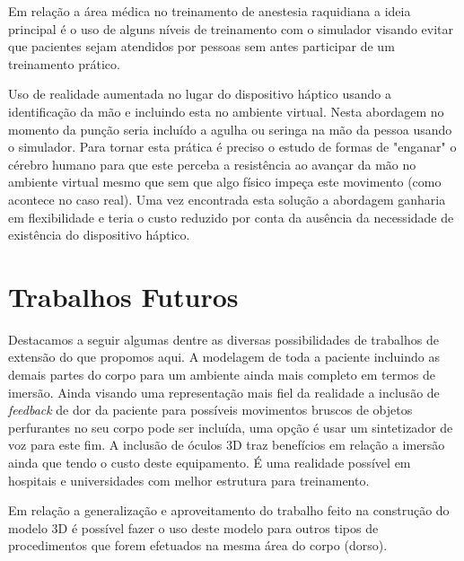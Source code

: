 Em relação a área médica no treinamento de anestesia raquidiana a ideia principal é o uso de alguns níveis de treinamento com o simulador visando evitar que pacientes sejam atendidos por pessoas sem antes participar de um treinamento prático.

Uso de realidade aumentada no lugar do dispositivo háptico usando a identificação da mão e incluindo esta no ambiente virtual. Nesta abordagem no momento da punção seria incluído a agulha ou seringa na mão da pessoa usando o simulador. Para tornar esta prática é preciso o estudo de formas de "enganar" o cérebro humano para que este perceba a resistência ao avançar da mão no ambiente virtual mesmo que sem que algo físico impeça este movimento (como acontece no caso real). Uma vez encontrada esta solução a abordagem ganharia em flexibilidade e teria o custo reduzido por conta da ausência da necessidade de existência do dispositivo háptico.

\section{Trabalhos Futuros}
\label{sec:trabFuturo}

Destacamos a seguir algumas dentre as diversas possibilidades de trabalhos de extensão do que propomos aqui. A modelagem de toda a paciente incluindo as demais partes do corpo para um ambiente ainda mais completo em termos de imersão. Ainda visando uma representação mais fiel da realidade a inclusão de \textit{feedback} de dor da paciente para possíveis movimentos bruscos de objetos perfurantes no seu corpo pode ser incluída, uma opção é usar um sintetizador de voz para este fim. A inclusão de óculos 3D traz benefícios em relação a imersão ainda que tendo o custo deste equipamento. É uma realidade possível em hospitais e universidades com melhor estrutura para treinamento.

Em relação a generalização e aproveitamento do trabalho feito na construção do modelo 3D é possível fazer o uso deste modelo para outros tipos de procedimentos que forem efetuados na mesma área do corpo (dorso). 